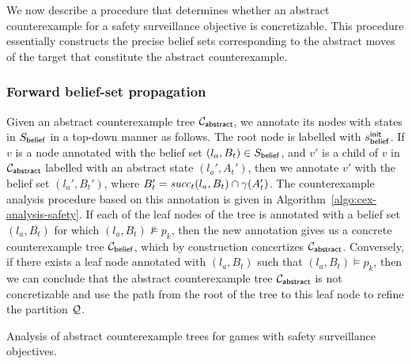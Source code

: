 We now describe a procedure that determines whether an abstract counterexample for a safety surveillance objective is concretizable. This procedure essentially constructs the precise belief sets corresponding to the abstract moves of the target that constitute the abstract counterexample.

\subsubsection{Forward belief-set propagation}
Given an abstract counterexample tree $\mathcal{C}_{\mathsf{abstract}}$, we annotate its nodes with states in $S_{\mathsf{belief}}$ in a top-down manner as follows. 
The root node is labelled with $s_{\mathsf{belief}}^{\mathsf{init}}$. 
If $v$ is a node annotated with the belief set $(l_a,B_t) \in S_{\mathsf{belief}}$, and  $v'$ is a child of $v$ in $\mathcal{C}_{\mathsf{abstract}}$ labelled with an abstract state $(l_a',A_t')$, then we annotate $v'$ with the belief set $(l_a',B_t')$, where 
$B_t' = \mathit{succ}_t(l_a,B_t) \cap \gamma(A_t')$. The counterexample analysis procedure based on this annotation is given in Algorithm~\ref{algo:cex-analysis-safety}.
If each of the leaf nodes of the tree is annotated with a belief set $(l_a,B_t)$ for which $(l_a,B_t) \not\models p_k$, then the new annotation gives us a concrete counterexample tree $\mathcal{C}_{\mathsf{belief}}$, which by construction concertizes $\mathcal{C}_{\mathsf{abstract}}$. Conversely, if there exists a leaf node annotated with $(l_a,B_t)$ such that $(l_a,B_t) \models p_k$, then we can conclude that the abstract counterexample tree $\mathcal{C}_{\mathsf{abstract}}$ is not concretizable and use the path from the root of the tree to this leaf node to refine the partition $\mathcal{Q}$.

\begin{algorithm}[b]
\vspace{-.4cm}
\small
{}


%
{\KwRet{$\pi$;}}
{}



\caption{Analysis of abstract counterexample trees for games with safety surveillance objectives.}
\label{algo:cex-analysis-safety}
\end{algorithm}


